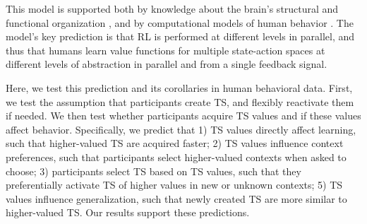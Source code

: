 \documentclass[10pt, letterpaper]{article}
\begin{document}

This model is supported both by knowledge about the brain's structural and functional organization \cite{alexander_parallel_1986, badre_mechanisms_2012}, and by computational models of human behavior \cite{frank_mechanisms_2012}. The model's key prediction is that RL is performed at different levels in parallel, and thus that humans learn value functions for multiple state-action spaces at different levels of abstraction in parallel and from a single feedback signal.

Here, we test this prediction and its corollaries in human behavioral data. First, we test the assumption that participants create TS, and flexibly reactivate them if needed. We then test whether participants acquire TS values and if these values affect behavior. Specifically, we predict that 1) TS values directly affect learning, such that higher-valued TS are acquired faster; 2) TS values influence context preferences, such that participants select higher-valued contexts when asked to choose; 3) participants select TS based on TS values, such that they preferentially activate TS of higher values in new or unknown contexts; 5) TS values influence generalization, such that newly created TS are more similar to higher-valued TS. Our results support these predictions.
\end{document}
